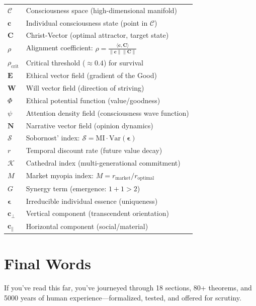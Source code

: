 \documentclass[11pt,a4paper]{article}
\theoremstyle{definition}
\theoremstyle{remark}
\newcommand{\CC}{\mathcal{C}}
\newcommand{\EE}{\mathbf{E}}
\newcommand{\WW}{\mathbf{W}}
\newcommand{\cc}{\mathbf{c}}
\begin{document}
\begin{enumerate}
\begin{protocol}
\begin{tabular}{ll}
\(\CC\) & Consciousness space (high-dimensional manifold) \\
\(\cc\) & Individual consciousness state (point in \(\CC\)) \\
\(\mathbf{C}\) & Christ-Vector (optimal attractor, target state) \\
\(\rho\) & Alignment coefficient: \(\rho = \frac{\langle \cc, \mathbf{C} \rangle}{\|\cc\|\|\mathbf{C}\|}\) \\
\(\rho_{\text{crit}}\) & Critical threshold (\(\approx 0.4\)) for survival \\
\(\EE\) & Ethical vector field (gradient of the Good) \\
\(\WW\) & Will vector field (direction of striving) \\
\(\Phi\) & Ethical potential function (value/goodness) \\
\(\psi\) & Attention density field (consciousness wave function) \\
\(\mathbf{N}\) & Narrative vector field (opinion dynamics) \\
\(\mathcal{S}\) & Sobornost' index: \(\mathcal{S} = \text{MI} \cdot \text{Var}(\boldsymbol{\epsilon})\) \\
\(r\) & Temporal discount rate (future value decay) \\
\(\mathcal{K}\) & Cathedral index (multi-generational commitment) \\
\(M\) & Market myopia index: \(M = r_{\text{market}}/r_{\text{optimal}}\) \\
\(G\) & Synergy term (emergence: \(1+1>2\)) \\
\(\boldsymbol{\epsilon}\) & Irreducible individual essence (uniqueness) \\
\(\cc_\perp\) & Vertical component (transcendent orientation) \\
\(\cc_\parallel\) & Horizontal component (social/material) \\
\end{tabular}

\vspace{2em}

\section*{Final Words}

If you've read this far, you've journeyed through 18 sections, 80+ theorems, and 5000 years of human experience—formalized, tested, and offered for scrutiny.


\end{protocol}
\end{enumerate}
\end{document}
